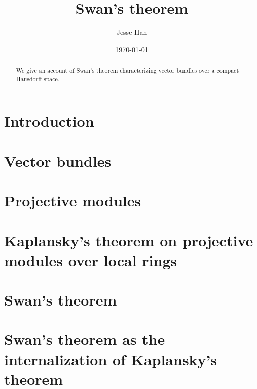 \documentclass[11pt]{article}
\begin{document}
\title{Swan's theorem}
\author{Jesse Han}
\date{\today}

\maketitle

\begin{abstract}
We give an account of Swan's theorem characterizing vector bundles over a compact Hausdorff space.
\end{abstract}

\section*{Introduction}
\section{Vector bundles}

\section{Projective modules}

\section{Kaplansky's theorem on projective modules over local rings}

\section{Swan's theorem}

\section{Swan's theorem as the internalization of Kaplansky's theorem}
\end{document}
